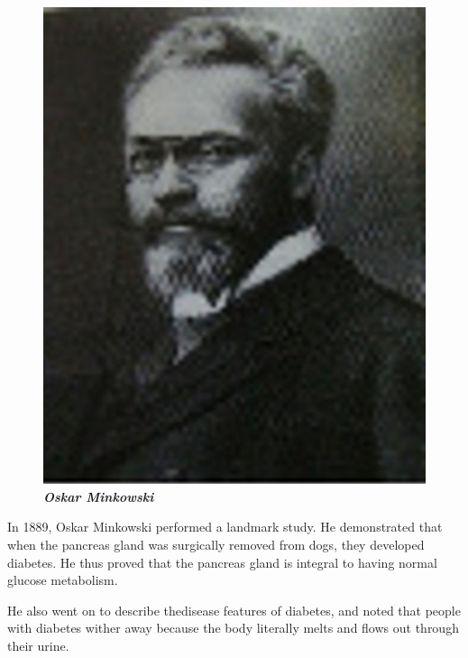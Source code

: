 \begin{figure}
\centering
\includegraphics[scale=.6]{images/009.jpg}\\
\textbf{\textit{Oskar Minkowski}}
\end{figure}

In 1889, Oskar Minkowski performed a landmark study. He demonstrated that when the pancreas gland was surgically removed from dogs, they developed diabetes. He thus proved that the pancreas gland is integral to having normal glucose metabolism.

He also went on to describe the\break disease features of diabetes, and noted that people with diabetes wither away because the body literally melts and flows out through their urine.

